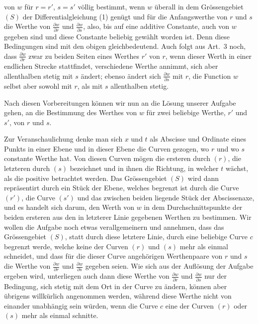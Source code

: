 \documentclass[12pt,a4paper]{article}
\begin{document}
von $w$ f\"ur $r = r'$, $s = s'$ v\"ollig bestimmt, wenn $w$ \"uberall in dem Gr\"ossengebiet $(S)$ der Differentialgleichung (1) gen\"ugt und f\"ur die Anfangswerthe von $r$ und $s$ die Werthe von $\frac{\partial w}{\partial r}$ und $\frac{\partial w}{\partial s}$, also, bis auf eine additive Constante, auch von $w$ gegeben sind und diese Constante beliebig gew\"ahlt worden ist. Denn diese Bedingungen sind mit den obigen gleichbedeutend. Auch folgt aus Art.~3 noch, dass $\frac{\partial w}{\partial r}$ zwar zu beiden Seiten eines Werthes $r'$ von $r$, wenn dieser Werth in einer endlichen Strecke stattfindet, verschiedene Werthe annimmt, sich aber allenthalben stetig mit $s$ \"andert; ebenso \"andert sich $\frac{\partial w}{\partial s}$ mit $r$, die Function $w$ selbst aber sowohl mit $r$, als mit $s$ allenthalben stetig.

Nach diesen Vorbereitungen k\"onnen wir nun an die L\"osung unserer Aufgabe gehen, an die Bestimmung des Werthes von $w$ f\"ur zwei beliebige Werthe, $r'$ und $s'$, von $r$ und $s$.

Zur Veranschaulichung denke man sich $x$ und $t$ als Abscisse und Ordinate eines Punkts in einer Ebene und in dieser Ebene die Curven gezogen, wo $r$ und wo $s$ constante Werthe hat. Von diesen Curven m\"ogen die ersteren durch $(r)$, die letzteren durch $(s)$ bezeichnet und in ihnen die Richtung, in welcher $t$ w\"achst, als die positive betrachtet werden. Das Gr\"ossengebiet $(S)$ wird dann repr\"asentirt durch ein St\"uck der Ebene, welches begrenzt ist durch die Curve $(r')$, die Curve $(s')$ und das zwischen beiden liegende St\"uck der Abscissenaxe, und es handelt sich darum, den Werth von $w$ in dem Durchschnittspunkte der beiden ersteren aus den in letzterer Linie gegebenen Werthen zu bestimmen. Wir wollen die Aufgabe noch etwas verallgemeinern und annehmen, dass das Gr\"ossengebiet $(S)$, statt durch diese letztere Linie, durch eine beliebige Curve $c$ begrenzt werde, welche keine der Curven $(r)$ und $(s)$ mehr als einmal schneidet, und dass f\"ur die dieser Curve angeh\"origen Werthenpaare von $r$ und $s$ die Werthe von $\frac{\partial w}{\partial r}$ und $\frac{\partial w}{\partial s}$ gegeben seien. Wie sich aus der Aufl\"osung der Aufgabe ergeben wird, unterliegen auch dann diese Werthe von $\frac{\partial w}{\partial r}$ und $\frac{\partial w}{\partial s}$ nur der Bedingung, sich stetig mit dem Ort in der Curve zu \"andern, k\"onnen aber \"ubrigens willk\"urlich angenommen werden, w\"ahrend diese Werthe nicht von einander unabh\"angig sein w\"urden, wenn die Curve $c$ eine der Curven $(r)$ oder $(s)$ mehr als einmal schnitte.
\end{document}
